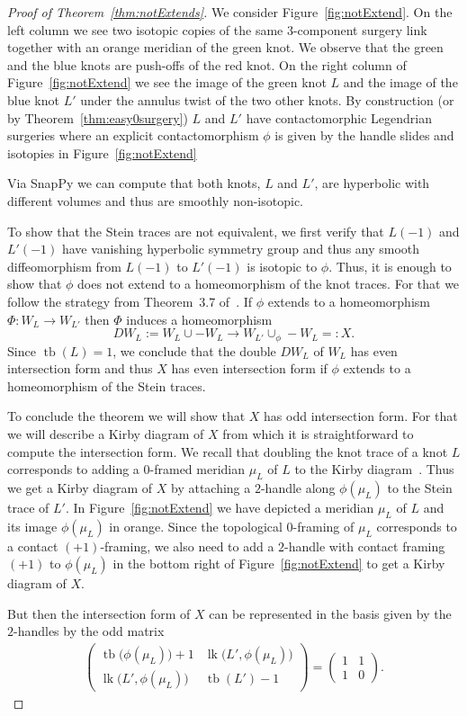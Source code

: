 \documentclass[11pt]{amsart} %
\DeclareMathOperator{\tb}{tb}
\DeclareMathOperator{\lk}{lk}
\theoremstyle{plain}
\theoremstyle{definition}
\begin{document}
\begin{proof}[Proof of Theorem~\ref{thm:notExtends}]
	We consider Figure~\ref{fig:notExtend}. On the left column we see two isotopic copies of the same $3$-component surgery link together with an orange meridian of the green knot. We observe that the green and the blue knots are push-offs of the red knot. On the right column of Figure~\ref{fig:notExtend} we see the image of the green knot $L$ and the image of the blue knot $L'$ under the annulus twist of the two other knots. By construction (or by Theorem~\ref{thm:easy0surgery}) $L$ and $L'$ have contactomorphic Legendrian surgeries where an explicit contactomorphism $\phi$ is given by the handle slides and isotopies in Figure~\ref{fig:notExtend}
	
	Via SnapPy we can compute that both knots, $L$ and $L'$, are hyperbolic with different volumes and thus are smoothly non-isotopic. 
	
	To show that the Stein traces are not equivalent, we first verify that $L(-1)$ and $L'(-1)$ have vanishing hyperbolic symmetry group and thus any smooth diffeomorphism from $L(-1)$ to $L'(-1)$ is isotopic to $\phi$. Thus, it is enough to show that $\phi$ does not extend to a homeomorphism of the knot traces. For that we follow the strategy from Theorem~3.7 of~\cite{ManolescuPiccirillo21}. If $\phi$ extends to a homeomorphism $\Phi\colon W_L\rightarrow W_{L'}$ then $\Phi$ induces a homeomorphism $$DW_L:=W_L\cup -W_L\longrightarrow W_{L'}\cup_{\phi} -W_L=:X.$$
	Since $\tb(L)=1$, we conclude that the double $DW_L$ of $W_L$ has even intersection form and thus $X$ has even intersection form if $\phi$ extends to a homeomorphism of the Stein traces. 
	
	To conclude the theorem we will show that $X$ has odd intersection form. For that we will describe a Kirby diagram of $X$ from which it is straightforward to compute the intersection form. We recall that doubling the knot trace of a knot $L$ corresponds to adding a $0$-framed meridian $\mu_L$ of $L$ to the Kirby diagram~\cite{GompfStipsicz99}. Thus we get a Kirby diagram of $X$ by attaching a $2$-handle along $\phi(\mu_L)$ to the Stein trace of $L'$. In Figure~\ref{fig:notExtend} we have depicted a meridian $\mu_L$ of $L$ and its image $\phi(\mu_L)$ in orange. Since the topological $0$-framing of $\mu_L$ corresponds to a contact $(+1)$-framing, we also need to add a $2$-handle with contact framing $(+1)$ to $\phi(\mu_L)$ in the bottom right of Figure~\ref{fig:notExtend} to get a Kirby diagram of $X$.
	
	But then the intersection form of $X$ can be represented in the basis given by the $2$-handles by the odd matrix
	\begin{align*}
	\begin{pmatrix}
	\tb\big(\phi(\mu_L)\big)+1 & \lk\big(L',\phi(\mu_L)\big) \\
	\lk\big(L',\phi(\mu_L)\big) & \tb(L')-1 
	\end{pmatrix}=\begin{pmatrix}
	1 & 1 \\
	1 & 0 
	\end{pmatrix}.
	\end{align*}
\end{proof}
\end{document}
